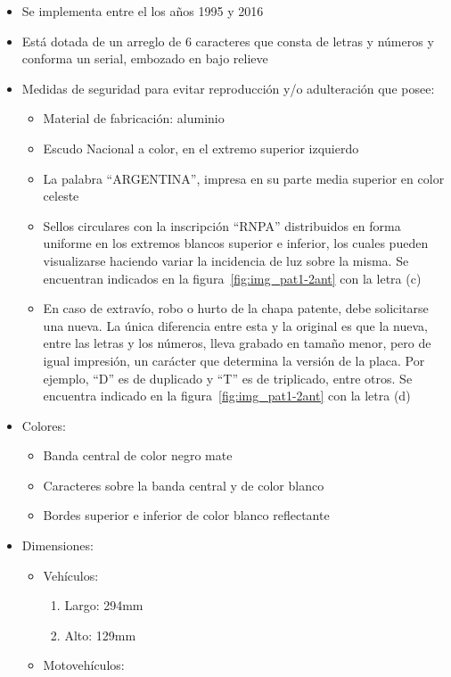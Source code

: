\begin{itemize}
	\item Se implementa entre el los años 1995 y 2016
	\item Está dotada de un arreglo de 6 caracteres que consta de letras y números y conforma un serial, embozado en bajo relieve
	\item Medidas de seguridad para evitar reproducción y/o adulteración que posee:
	\begin{itemize}
		\item Material de fabricación: aluminio
		\item Escudo Nacional a color, en el extremo superior izquierdo
		\item La palabra “ARGENTINA”, impresa en su parte media superior en color celeste
		\item Sellos circulares con la inscripción “RNPA” distribuidos en forma uniforme en los extremos blancos superior e inferior, los cuales pueden visualizarse haciendo variar la incidencia de luz sobre la misma. Se encuentran indicados en la figura~\ref{fig:img_pat1-2ant} con la letra (c)
		\item En caso de extravío, robo o hurto de la chapa patente, debe solicitarse una nueva. La única diferencia entre esta y la original es que la nueva, entre las letras y los números, lleva grabado en tamaño menor, pero de igual impresión, un carácter que determina la versión de la placa. Por ejemplo, “D” es de duplicado y  “T” es de triplicado, entre otros. Se encuentra indicado en la figura~\ref{fig:img_pat1-2ant} con la letra (d)
	\end{itemize}
	\item Colores:
	\begin{itemize}
		\item Banda central de color negro mate
		\item Caracteres sobre la banda central y de color blanco
		\item Bordes superior e inferior de color blanco reflectante
	\end{itemize}
	\item Dimensiones: 
	\begin{itemize}
		\item Vehículos:
		\begin{enumerate}
			\item Largo: 294mm 
			\item Alto: 129mm 
		\end{enumerate}
		\item Motovehículos:

\end{itemize}
\end{itemize}
